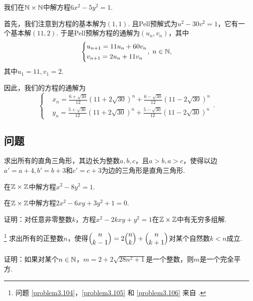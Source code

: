 \begin{example}
  我们在$\mathbb N\times\mathbb N$中解方程$6x^2-5y^2=1$.

  首先，我们注意到方程的基本解为$(1,1)$. 且Pell预解式为$u^2-30v^2=1$，它有一个基本解$(11,2)$. 于是Pell预解方程的通解为$(u_n,v_n)$，其中
  \[
    \left\{
     \begin{aligned}
       & u_{n+1} = 11u_n + 60v_n \\
       & v_{n+1} = 2u_n + 11v_n
     \end{aligned}
    \right.,\; n\in\MN,
  \]
  其中$u_1=11,v_1=2$.

  因此，我们的方程的通解为
  \[
    \left\{
      \begin{aligned}
        & x_n = \frac{6+\sqrt{30}}{12} ( 11 + 2\sqrt{30} )^n + \frac{6-\sqrt{30}}{12}( 11 - 2\sqrt{30} )^n \\
        & y_n = \frac{5+\sqrt{30}}{12} ( 11 + 2\sqrt{30} )^n + \frac{5-\sqrt{30}}{12}( 11 - 2\sqrt{30} )^n
      \end{aligned}
    \right..
  \]
\end{example}

\subsection{问题}
\begin{problem}
  求出所有的直角三角形，其边长为整数$a,b,c$，且$a>b,a>c$，使得以边$a'=a+4,b'=b+3$和$c'=c+3$为边的三角形是直角三角形.
\end{problem}

\begin{problem}
  在$\mathbb Z\times\mathbb Z$中解方程$x^2-8y^2=1$.
\end{problem}

\begin{problem}
  在$\mathbb Z\times\mathbb Z$中解方程$2x^2-6xy+3y^2+1=0$.
\end{problem}

\begin{problem}
  证明：对任意非零整数$k$，方程$x^2-2kxy+y^2=1$在$\mathbb Z\times\mathbb Z$中有无穷多组解.
\end{problem}

\begin{problem}
  \footnote{问题 \ref{problem3.104}，\ref{problem3.105} 和 \ref{problem3.106} 来自 \cite{16}.} 求出所有的正整数$n$，使得$\Binom n{k-1}=2\Binom nk+\Binom n{k+1}$对某个自然数$k<n$成立.
\end{problem}

\begin{problem}
  证明：如果对某个$n\in\mathbb N$，$m=2+2\sqrt{28n^2+1}$是一个整数，则$m$是一个完全平方.
\end{problem}

